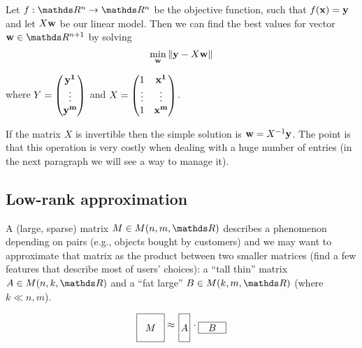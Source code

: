 \documentclass[computationalMathematics.tex]{subfiles}
\begin{document}
\begin{definition}
  Let $f: \R^n \to \R^n$ be the objective function, such that $f({\bf x }) = {\bf y }$ and let $X{\bf w }$ be our linear model. Then we can find the best values for vector $\vect{w} \in \R^{n+1}$ by solving
\[
	\min_{{\bf w }} \left\lVert{\bf y } - X {\bf w }\right\rVert
\]

where $Y = \begin{pmatrix} {\bf y^1 }\\ \vdots\\ {\bf y^m } \end{pmatrix}$ and $X = \begin{pmatrix} 1 & {\bf x^1 }\\ \vdots & \vdots\\ 1 & {\bf x^m } \end{pmatrix}$.
\end{definition}

If the matrix $X$ is invertible then the simple solution is ${\bf w } = {X}^{-1}{\bf y }$.
The point is that this operation is very costly when dealing with a huge number of entries (in the next paragraph we will see a way to manage it).
\subsection{Low-rank approximation}
A (large, sparse) matrix $M \in M(n, m, \R)$ describes a phenomenon depending
on pairs (e.g., objects bought by customers) and we may want to approximate that matrix as the product between two smaller matrices (find a few features that describe most of users' choices): a ``tall thin'' matrix $A\in M(n, k, \R)$ and a ``fat large'' $B\in M(k, m, \R)$ (where $k\ll n, m$).

\[
  \begin{tikzpicture}[baseline=(current bounding box.center)]
    \draw (0,0) rectangle (1,1);
    \node at (0.5,0.5) {$M$};
  \end{tikzpicture}
  \approx
  \begin{tikzpicture}[baseline=(current bounding box.center)]
    \draw (0,0) rectangle (0.4,1);
    \node at (0.2,0.5) {$A$};
  \end{tikzpicture}
  \cdot
  \begin{tikzpicture}[baseline=(current bounding box.center)]
    \draw (0,0) rectangle (1,0.4);
    \node at (0.5,0.2) {$B$};
  \end{tikzpicture}
\]
\end{document}
